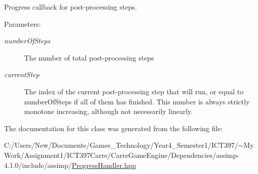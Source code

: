 Progress callback for post-processing steps. 

\begin{Desc}
\item[Parameters:]
\begin{description}
\item[{\em numberOfSteps}]The number of total post-processing steps \item[{\em currentStep}]The index of the current post-processing step that will run, or equal to numberOfSteps if all of them has finished. This number is always strictly monotone increasing, although not necessarily linearly. \end{description}
\end{Desc}


The documentation for this class was generated from the following file:\begin{CompactItemize}
\item 
C:/Users/New/Documents/Games\_\-Technology/Year4\_\-Semester1/ICT397/$\sim$My Work/Assignment1/ICT397Carre/CarreGameEngine/Dependencies/assimp-4.1.0/include/assimp/\hyperlink{_progress_handler_8hpp}{ProgressHandler.hpp}\end{CompactItemize}
